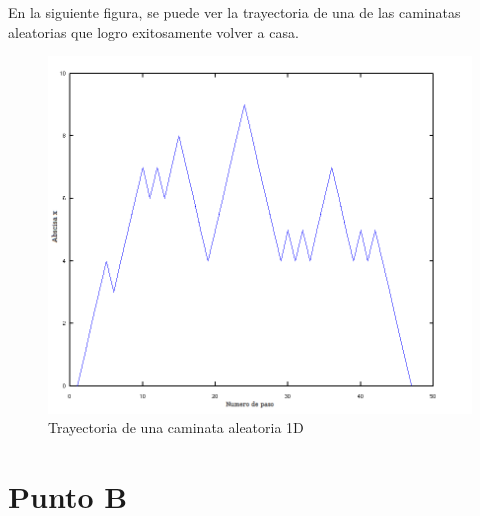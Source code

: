 \documentclass[a4paper,10pt]{article}
\begin{document}
En la siguiente figura, se puede ver la trayectoria de una de las caminatas aleatorias que logro exitosamente volver a casa.
\begin{center}
  \begin{figure}[H]
  \includegraphics[scale=0.5]{./images/rec1edit.png}
    \caption{Trayectoria de una caminata aleatoria 1D}
  \end{figure}
\end{center} 
\newpage
\section{Punto B}
\end{document}
